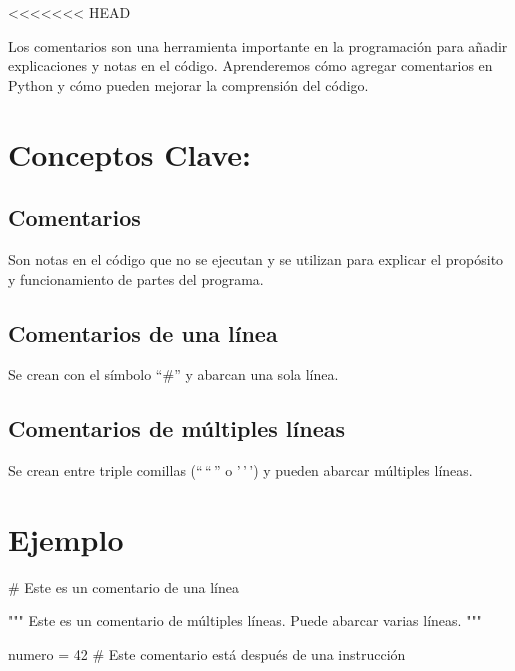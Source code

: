 \documentclass[
  a4paper,
  DIV=11,
  numbers=noendperiod,
  onepage,
  openany]{scrreprt}
\newenvironment{Shaded}{\begin{snugshade}}{\end{snugshade}}
\newcommand{\CommentTok}[1]{\textcolor[rgb]{0.37,0.37,0.37}{#1}}
\newcommand{\DecValTok}[1]{\textcolor[rgb]{0.68,0.00,0.00}{#1}}
\newcommand{\NormalTok}[1]{\textcolor[rgb]{0.00,0.23,0.31}{#1}}
\newcommand{\OperatorTok}[1]{\textcolor[rgb]{0.37,0.37,0.37}{#1}}
\begin{document}
\textless\textless\textless\textless\textless\textless\textless{} HEAD

Los comentarios son una herramienta importante en la programación para
añadir explicaciones y notas en el código. Aprenderemos cómo agregar
comentarios en Python y cómo pueden mejorar la comprensión del código.

\hypertarget{conceptos-clave-8}{%
\section{Conceptos Clave:}\label{conceptos-clave-8}}

\hypertarget{comentarios-1}{%
\subsection{Comentarios}\label{comentarios-1}}

Son notas en el código que no se ejecutan y se utilizan para explicar el
propósito y funcionamiento de partes del programa.

\hypertarget{comentarios-de-una-luxednea}{%
\subsection{Comentarios de una
línea}\label{comentarios-de-una-luxednea}}

Se crean con el símbolo ``\#'' y abarcan una sola línea.

\hypertarget{comentarios-de-muxfaltiples-luxedneas}{%
\subsection{Comentarios de múltiples
líneas}\label{comentarios-de-muxfaltiples-luxedneas}}

Se crean entre triple comillas (``\,``\,'' o '\,'\,') y pueden abarcar
múltiples líneas.

\hypertarget{ejemplo-8}{%
\section{Ejemplo}\label{ejemplo-8}}

\begin{Shaded}
\begin{Highlighting}[]
\CommentTok{\# Este es un comentario de una línea}

\CommentTok{"""}
\CommentTok{Este es un comentario}
\CommentTok{de múltiples líneas.}
\CommentTok{Puede abarcar varias líneas.}
\CommentTok{"""}

\NormalTok{numero }\OperatorTok{=} \DecValTok{42}  \CommentTok{\# Este comentario está después de una instrucción}
\end{Highlighting}
\end{Shaded}
\end{document}
